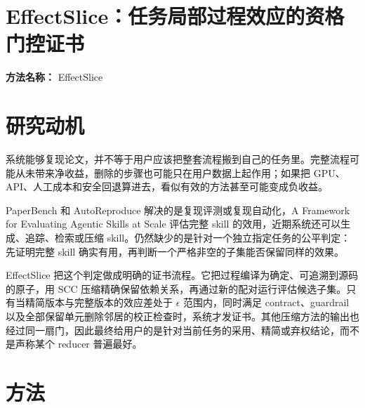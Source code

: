 \documentclass[10pt,a4paper]{article}
\begin{document}
\section*{EffectSlice：任务局部过程效应的资格门控证书}
\textbf{方法名称：} EffectSlice
\section*{研究动机}
系统能够复现论文，并不等于用户应该把整套流程搬到自己的任务里。完整流程可能从未带来净收益，删除的步骤也可能只在用户数据上起作用；如果把 GPU、API、人工成本和安全回退算进去，看似有效的方法甚至可能变成负收益。

PaperBench 和 AutoReproduce 解决的是复现评测或复现自动化，A Framework for Evaluating Agentic Skills at Scale 评估完整 skill 的效用，近期系统还可以生成、追踪、检索或压缩 skill。仍然缺少的是针对一个独立指定任务的公平判定：先证明完整 skill 确实有用，再判断一个严格非空的子集能否保留同样的效果。

EffectSlice 把这个判定做成明确的证书流程。它把过程编译为确定、可追溯到源码的原子，用 SCC 压缩精确保留依赖关系，再通过新的配对运行评估候选子集。只有当精简版本与完整版本的效应差处于 \(\epsilon \) 范围内，同时满足 contract、guardrail 以及全部保留单元删除邻居的校正检查时，系统才发证书。其他压缩方法的输出也经过同一扇门，因此最终给用户的是针对当前任务的采用、精简或弃权结论，而不是声称某个 reducer 普遍最好。
\section*{方法}
\end{document}
